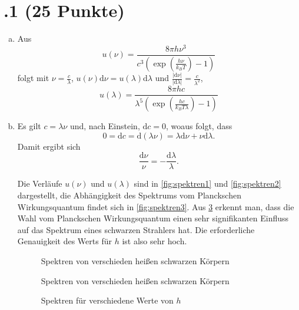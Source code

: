 \section*{\nr.1 \titone (25 Punkte)}
\begin{enumerate}[(a)]
\item Aus 
\begin{equation}
  u(\nu)=\frac{8\pi h\nu^3}{c^3\left(\exp\left(\frac{h\nu}{k_BT}\right)-1\right)}
\end{equation}
folgt mit $\nu=\frac{c}{\lambda}$, $u(\nu)\mathrm{d}\nu=u(\lambda)\mathrm{d}\lambda$ und $\frac{|\mathrm{d}\nu|}{|\mathrm{d}\lambda|}=\frac{c}{\lambda^2}$, 
\begin{equation}
  u(\lambda)=\frac{8\pi hc}{\lambda^5\left(\exp\left(\frac{hc}{k_BT\lambda}\right)-1\right)}
\end{equation}
\item Es gilt $c=\lambda\nu$ und, nach Einstein, $\mathrm{d}c=0$, woaus folgt, dass
\begin{equation}
  0=\mathrm{d}c=\mathrm{d}(\lambda\nu)=\lambda \mathrm{d}\nu+\nu \mathrm{d}\lambda.
\end{equation}
Damit ergibt sich
\begin{equation}
  \frac{\mathrm{d}\nu}{\nu}=-\frac{\mathrm{d}\lambda}{\lambda}.
\end{equation}

Die Verläufe $u(\nu)$ und $u(\lambda)$ sind in \vref{fig:spektren1} und \vref{fig:spektren2} dargestellt, die Abhängigkeit des Spektrums vom Planckschen Wirkungsquantum findet sich in \vref{fig:spektren3}.
Aus \ref{fig:spektren3} erkennt man, dass die Wahl vom Planckschen Wirkungsquantum einen sehr signifikanten Einfluss auf das Spektrum eines schwarzen Strahlers hat. Die erforderliche Genauigkeit des Werts für $h$ ist also sehr hoch.

\begin{figure}[htbp]
\centering

\caption{Spektren von verschieden heißen schwarzen Körpern}
\label{fig:spektren1}
\end{figure}

\begin{figure}[htbp]
\centering
 
\caption{Spektren von verschieden heißen schwarzen Körpern}
\label{fig:spektren2}
\end{figure}

\begin{figure}[htbp]
\centering

\caption{Spektren für verschiedene Werte von $h$}
\label{fig:spektren3}
\end{figure}


\end{enumerate}
